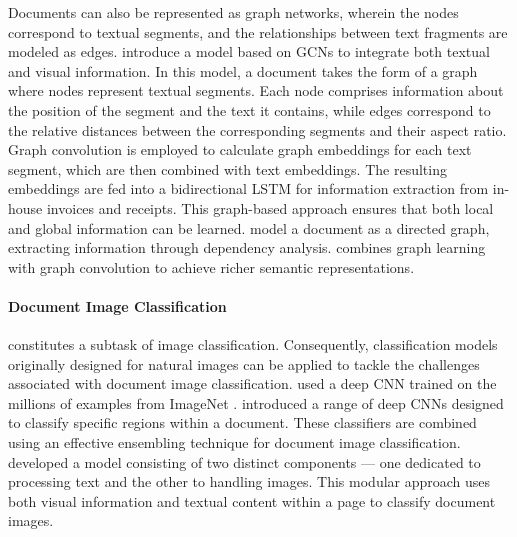 Documents can also be represented as graph networks, wherein the nodes correspond to textual segments, and the relationships between text fragments are modeled as edges. \citet{liu2019graph} introduce a model based on \acp{GCN} to integrate both textual and visual information. In this model, a document takes the form of a graph where nodes represent textual segments. Each node comprises information about the position of the segment and the text it contains, while edges correspond to the relative distances between the corresponding segments and their aspect ratio. Graph convolution is employed to calculate graph embeddings for each text segment, which are then combined with text embeddings. The resulting embeddings are fed into a bidirectional \ac{LSTM} for information extraction from in-house invoices and receipts. This graph-based approach ensures that both local and global information can be learned. \citet{hwang2020spatial} model a document as a directed graph, extracting information through dependency analysis. \citet{yu2021pick} combines graph learning with graph convolution to achieve richer semantic representations. \\

\paragraph{Document Image Classification} constitutes a subtask of image classification. Consequently, classification models originally designed for natural images can be applied to tackle the challenges associated with document image classification. \citet{afzal2015deepdocclassifier} used a deep \ac{CNN} trained on the millions of examples from ImageNet \citep{deng2009imagenet}. \citet{das2018document} introduced a range of deep \acp{CNN} designed to classify specific regions within a document. These classifiers are combined using an effective ensembling technique for document image classification. \citet{dauphinee2019modular}  developed a model consisting of two distinct components — one dedicated to processing text and the other to handling images. This modular approach uses both visual information and textual content within a page to classify document images.

